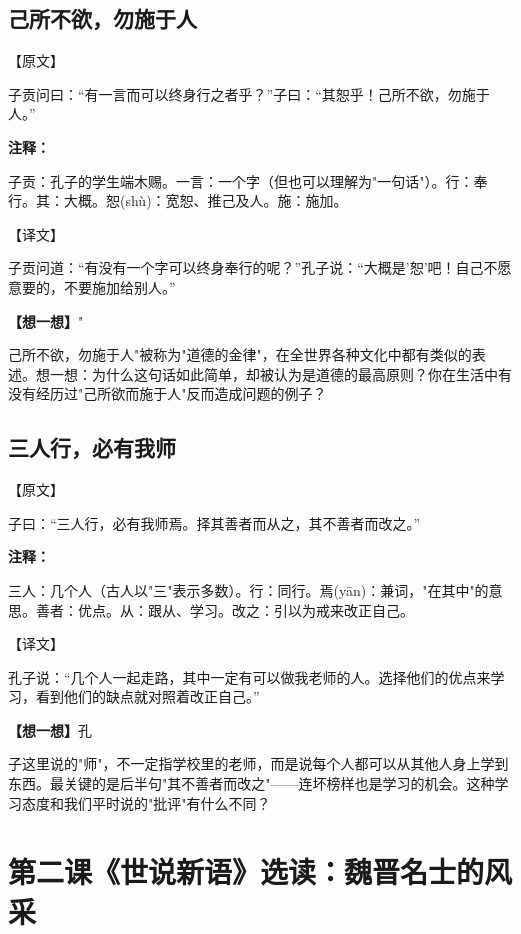 \documentclass[a4paper,12pt]{ctexart}
\newcommand{\annlist}[1]{{\vspace{0.15cm}\noindent\textcolor{orange!80!black}{\small\bfseries 注释：}\par\footnotesize #1\par}}
\newcommand{\thinkq}[1]{\vspace{0.2cm}\noindent\textcolor{orange!60!black}{\small\bfseries【想一想】}{\small #1}\par}
\begin{document}
\subsection*{己所不欲，勿施于人}

\noindent\textcolor{blue!70!black}{\large【原文】}

子贡问曰：\textquotedblleft 有一言而可以终身行之者乎？\textquotedblright 子曰：\textquotedblleft 其恕乎！己所不欲，勿施于人。\textquotedblright

\annlist{子贡：孔子的学生端木赐。一言：一个字（但也可以理解为"一句话"）。行：奉行。其：大概。恕(shù)：宽恕、推己及人。施：施加。}

\noindent\textcolor{green!60!black}{\large【译文】}

子贡问道：\textquotedblleft 有没有一个字可以终身奉行的呢？\textquotedblright 孔子说：\textquotedblleft 大概是'恕'吧！自己不愿意要的，不要施加给别人。\textquotedblright

\thinkq "己所不欲，勿施于人"被称为"道德的金律"，在全世界各种文化中都有类似的表述。想一想：为什么这句话如此简单，却被认为是道德的最高原则？你在生活中有没有经历过"己所欲而施于人"反而造成问题的例子？

\subsection*{三人行，必有我师}

\noindent\textcolor{blue!70!black}{\large【原文】}

子曰：\textquotedblleft 三人行，必有我师焉。择其善者而从之，其不善者而改之。\textquotedblright

\annlist{三人：几个人（古人以"三"表示多数）。行：同行。焉(yān)：兼词，"在其中"的意思。善者：优点。从：跟从、学习。改之：引以为戒来改正自己。}

\noindent\textcolor{green!60!black}{\large【译文】}

孔子说：\textquotedblleft 几个人一起走路，其中一定有可以做我老师的人。选择他们的优点来学习，看到他们的缺点就对照着改正自己。\textquotedblright

\thinkq 孔子这里说的"师"，不一定指学校里的老师，而是说每个人都可以从其他人身上学到东西。最关键的是后半句"其不善者而改之"——连坏榜样也是学习的机会。这种学习态度和我们平时说的"批评"有什么不同？

\newpage

\section{\textcolor{orange!80!black}{第二课\quad 《世说新语》选读：魏晋名士的风采}}
\end{document}
